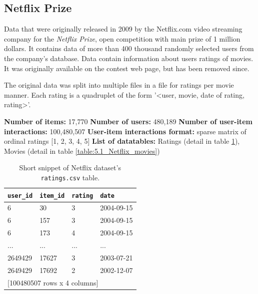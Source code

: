 

\subsection{Netflix Prize}

Data that were originally released in 2009 by the Netflix.com video streaming company for the \textit{Netflix Prize}, open competition with main prize of 1 million dollars. It contains data of more than 400 thousand randomly selected users from the company's database. Data contain information about users ratings of movies. It was originally available on the contest web page, but has been removed since.

The original data was split into multiple files in a file for ratings per movie manner. Each rating is a quadruplet of the form '\textless user, movie, date of rating, rating\textgreater'.

\hfill \break
\noindent
\textbf{Number of items:} 17,770 \newline
\textbf{Number of users:} 480,189 \newline
\textbf{Number of user-item interactions:} 100,480,507 \newline
\textbf{User-item interactions format:} sparse matrix of ordinal ratings [1, 2, 3, 4, 5] \newline
\textbf{List of datatables:} Ratings (detail in table \ref{table:5.1_Netflix_ratings}), Movies (detail in table \ref{table:5.1_Netflix_movies})

\begin{table}[!ht]
    \centering
    \begin{tabular}{ l l l l }
        \verb|user_id| & \verb|item_id| & \verb|rating| & \verb|date| \\
        \hline
              6 &             30 &             3 &  2004-09-15 \\
              6 &            157 &             3 &  2004-09-15 \\
              6 &            173 &             4 &  2004-09-15 \\
            ... &            ... &           ... &         ... \\
        2649429 &          17627 &             3 &  2003-07-21 \\
        2649429 &          17692 &             2 &  2002-12-07 \\ [1mm]
        \multicolumn{4}{l}{{[100480507 rows x 4 columns]}}
    \end{tabular}
    \caption{Short snippet of Netflix dataset's \texttt{ratings.csv} table.}
    \label{table:5.1_Netflix_ratings}
\end{table}
    
